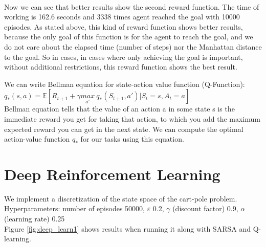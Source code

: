 \documentclass[a4paper, twoside, english]{article}
\begin{document}
~\\
Now we can see that better results show the second reward function. The time of working is 162.6 seconds and 3338 times agent reached the goal with 10000 episodes.
As stated above, this kind of reward function shows better results, because the only goal of this function is for the agent to reach the goal, and we do not care about the elapsed time (number of steps) nor the Manhattan distance to the goal. So in cases, in cases where only achieving the goal is important, without additional restrictions, this reward function shows the best result.



We can write Bellman equation for state-action value function (Q-Function):\\
$q_*(s, a) = \mathbb{E}[R_{t+1}+\gamma\underset{a'}{max} \ q_*(S_{t+1}, a')|S_t=s,A_t=a]$\\
Bellman equation  tells that the value of an action a in some state s is the immediate reward you get for taking that action, to which you add the maximum expected reward you can get in the next state. We can compute the optimal action-value function $q_*$ for our tasks using this equation.

\newpage

\section{Deep Reinforcement Learning}
We implement a discretization of the state space of the cart-pole problem. \\
Hyperparameters: number of episodes	50000, $\varepsilon$ 0.2, $\gamma$ (discount factor) 0.9, $\alpha$ (learning rate) 0.25\\
Figure \ref{fig:deep_learn1} shows results when running it along with SARSA and Q-learning. \\
\end{document}
